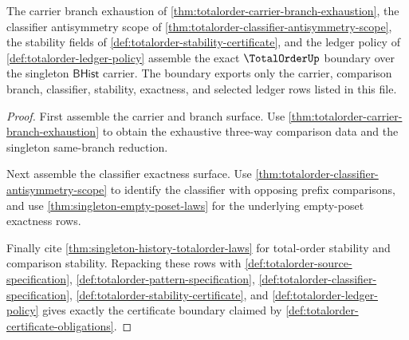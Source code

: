 \begin{theorem}
\label{thm:totalorder-certificate-boundary-exactness}
The carrier branch exhaustion of
\autoref{thm:totalorder-carrier-branch-exhaustion}, the classifier
antisymmetry scope of
\autoref{thm:totalorder-classifier-antisymmetry-scope}, the stability fields of
\autoref{def:totalorder-stability-certificate}, and the ledger policy of
\autoref{def:totalorder-ledger-policy} assemble the exact $\TotalOrderUp$
boundary over the singleton $\mathsf{BHist}$ carrier. The boundary exports only
the carrier, comparison branch, classifier, stability, exactness, and selected
ledger rows listed in this file.
\end{theorem}
\begin{proof}
First assemble the carrier and branch surface. Use
\autoref{thm:totalorder-carrier-branch-exhaustion} to obtain the exhaustive
three-way comparison data and the singleton same-branch reduction.

Next assemble the classifier exactness surface. Use
\autoref{thm:totalorder-classifier-antisymmetry-scope} to identify the
classifier with opposing prefix comparisons, and use
\autoref{thm:singleton-empty-poset-laws} for the underlying empty-poset
exactness rows.

Finally cite \autoref{thm:singleton-history-totalorder-laws} for total-order
stability and comparison stability. Repacking these rows with
\autoref{def:totalorder-source-specification},
\autoref{def:totalorder-pattern-specification},
\autoref{def:totalorder-classifier-specification},
\autoref{def:totalorder-stability-certificate}, and
\autoref{def:totalorder-ledger-policy} gives exactly the certificate boundary
claimed by \autoref{def:totalorder-certificate-obligations}.
\end{proof}

